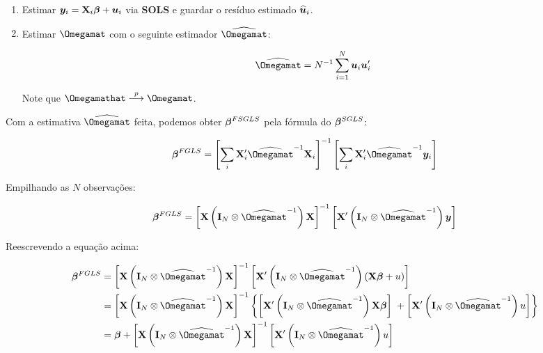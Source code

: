 \documentclass[11pt, oneside, a4paper, article]{article}
\numberwithin{equation}{section}
\begin{document}
\begin{description}
\begin{enumerate}
\item  %
Estimar $\boldsymbol{y}_{i} = \mathbf{X}_{i} \boldsymbol{\beta} + \boldsymbol{u}_{i}$ via \textbf{SOLS} e guardar o resíduo estimado $\widehat{\boldsymbol{u}}_{i}$.

\item  %
Estimar $\Omegamat$ com o seguinte estimador $\widehat{\Omegamat}$:

\vspace{-1.5 em}
\begin{align*}
\widehat{\Omegamat} 
= 
N^{-1} \sum_{i=1}^{N} \uvec_{i} \uvec_{i}'
\end{align*}

\noindent
Note que $\Omegamathat \arrowp \Omegamat$.
\end{enumerate}

Com a estimativa $\widehat{\Omegamat}$ feita, podemos obter $\boldsymbol{\beta}^{FSGLS}$ pela fórmula do $\boldsymbol{\beta}^{SGLS}$:

\vspace{-1.5 em}
\begin{align*}
\betavec^{FGLS}
= 
\left[ 
\sum_{i} \Xmat_{i}' \widehat{\Omegamat}^{-1} \Xmat_{i}
\right]^{-1}
\left[ 
\sum_{i} \Xmat_{i}' \widehat{\Omegamat}^{-1} \yvec_{i}
\right]
\end{align*}

Empilhando as $N$ observações:

\vspace{-1.5 em}
\begin{align*}
\betavec^{FGLS}
= 
\left[ \Xmat \left( \Imat_{N} \otimes \widehat{\Omegamat}^{-1} \right) \Xmat \right]^{-1}
\left[ \Xmat' \left( \Imat_{N} \otimes \widehat{\Omegamat}^{-1} \right) \yvec \right]
\end{align*}

Reescrevendo a equação acima:

\vspace{-1.5 em}
\begin{align*}
\betavec^{FGLS}
&= 
\left[  \Xmat \left( \Imat_{N} \otimes \widehat{\Omegamat}^{-1} \right) \Xmat \right]^{-1}
\left[  \Xmat' \left( \Imat_{N} \otimes \widehat{\Omegamat}^{-1} \right) (\Xmat \betavec + u) \right]
\\
&= 
\left[ \Xmat \left( \Imat_{N} \otimes \widehat{\Omegamat}^{-1} \right) \Xmat \right]^{-1}
\left\{ 
\left[ \Xmat' \left( \Imat_{N} \otimes \widehat{\Omegamat}^{-1} \right) \Xmat \betavec \right]
\; +
\left[ \Xmat' \left( \Imat_{N} \otimes \widehat{\Omegamat}^{-1} \right) u \right]
\right\}
\\
&= 
\betavec +
\left[ \Xmat \left( \Imat_{N} \otimes \widehat{\Omegamat}^{-1} \right) \Xmat \right]^{-1}
\left[ \Xmat' \left( \Imat_{N} \otimes \widehat{\Omegamat}^{-1} \right) u \right]
\end{align*}


\end{description}
\end{document}
